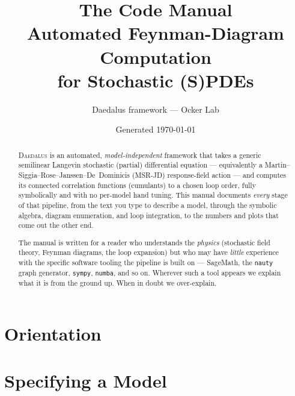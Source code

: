 \documentclass[11pt,oneside]{report}
\title{\Huge\bfseries The \Daedalus{} Code Manual\\[0.4em]
  \LARGE Automated \msrjd{} Feynman-Diagram Computation\\
  \large for Stochastic (S)PDEs}
\author{Daedalus framework --- Ocker Lab}
\date{Generated \today}
\newcommand{\code}[1]{\texttt{\small #1}}                 %
\newcommand{\Daedalus}{\textsc{Daedalus}}
\newcommand{\msrjd}{MSR\nobreakdash-JD}
\theoremstyle{definition}
\begin{document}
\maketitle

\begin{abstract}
\noindent
\Daedalus{} is an automated, \emph{model-independent} framework that takes a
generic semilinear Langevin stochastic (partial) differential equation ---
equivalently a Martin--Siggia--Rose--Janssen--De~Dominicis (\msrjd) response-field
action --- and computes its connected correlation functions (cumulants) to a
chosen loop order, fully symbolically and with no per-model hand tuning.  This
manual documents \emph{every} stage of that pipeline, from the text you type to
describe a model, through the symbolic algebra, diagram enumeration, and loop
integration, to the numbers and plots that come out the other end.

\medskip\noindent
The manual is written for a reader who understands the \emph{physics}
(stochastic field theory, Feynman diagrams, the loop expansion) but who may have
\emph{little} experience with the specific software tooling the pipeline is built
on --- SageMath, the \code{nauty} graph generator, \code{sympy}, \code{numba}, and
so on.  Wherever such a tool appears we explain what it is from the ground up.
When in doubt we over-explain.
\end{abstract}

\tableofcontents



\part{Orientation}



\part{Specifying a Model}



\end{document}
